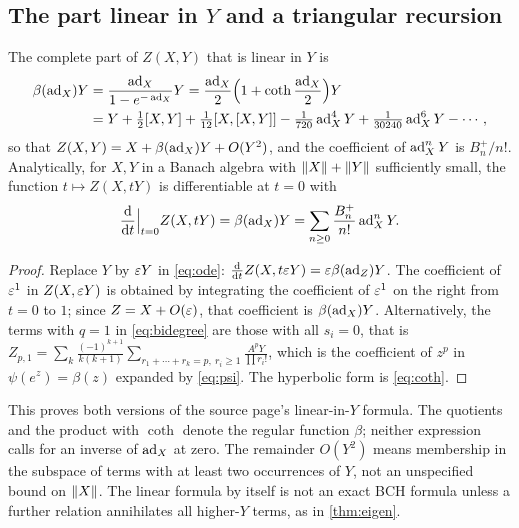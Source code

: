 \subsection{The part linear in \texorpdfstring{$Y$}{Y} and a triangular recursion}
\begin{corollary}\label{cor:linearY}
The complete part of $Z(X,Y)$ that is linear in $Y$ is
\begin{equation}\label{eq:linearY}
\begin{aligned}
 \beta(\operatorname{ad}_X)Y&=\frac{\operatorname{ad}_X}{1-e^{-\operatorname{ad}_X}}Y
 =\frac{\operatorname{ad}_X}{2}\Bigl(1+\coth\frac{\operatorname{ad}_X}{2}\Bigr)Y\\
 &=Y+\tfrac12[X,Y]+\tfrac1{12}[X,[X,Y]]-\tfrac1{720}\operatorname{ad}_X^4Y
   +\tfrac1{30240}\operatorname{ad}_X^6Y-\cdots,
\end{aligned}
\end{equation}
so that $Z(X,Y)=X+\beta(\operatorname{ad}_X)Y+O(Y^2)$, and the coefficient of $\operatorname{ad}_X^nY$
is $B_n^+/n!$. Analytically, for $X,Y$ in a Banach algebra with $\left\lVert X\right\rVert+\left\lVert Y\right\rVert$
sufficiently small, the function $t\mapsto Z(X,tY)$ is differentiable at
$t=0$ with
\begin{equation}\label{eq:linearYderiv}
 \frac{\mathrm{d}}{\mathrm{d} t}\Big|_{t=0}Z(X,tY)=\beta(\operatorname{ad}_X)Y
 =\sum_{n\geq0}\frac{B_n^+}{n!}\operatorname{ad}_X^nY.
\end{equation}
\end{corollary}
\begin{proof}
Replace $Y$ by $\varepsilon Y$ in \eqref{eq:ode}: $\frac{\mathrm{d}}{\mathrm{d} t}Z(X,t\varepsilon Y)
=\varepsilon\beta(\operatorname{ad}_{Z})Y$. The coefficient of $\varepsilon^1$ in $Z(X,\varepsilon Y)$ is
obtained by integrating the coefficient of $\varepsilon^1$ on the right from
$t=0$ to $1$; since $Z=X+O(\varepsilon)$, that coefficient is $\beta(\operatorname{ad}_X)Y$.
Alternatively, the terms with $q=1$ in \eqref{eq:bidegree} are those with
all $s_i=0$, that is $Z_{p,1}=\sum_{k}\frac{(-1)^{k+1}}{k(k+1)}
\sum_{r_1+\cdots+r_k=p,\ r_i\geq1}\frac{A^pY}{\prod r_i!}$, which is the
coefficient of $z^p$ in $\psi(e^z)=\beta(z)$ expanded by \eqref{eq:psi}.
The hyperbolic form is \eqref{eq:coth}.
\end{proof}
This proves both versions of the source page's linear-in-$Y$ formula. The
quotients and the product with $\coth$ denote the regular function $\beta$;
neither expression calls for an inverse of $\operatorname{ad}_X$ at zero. The remainder
$O(Y^2)$ means membership in the subspace of terms with at least two
occurrences of $Y$, not an unspecified bound on $\left\lVert X\right\rVert$. The linear
formula by itself is not an exact BCH formula unless a further relation
annihilates all higher-$Y$ terms, as in \cref{thm:eigen}.

